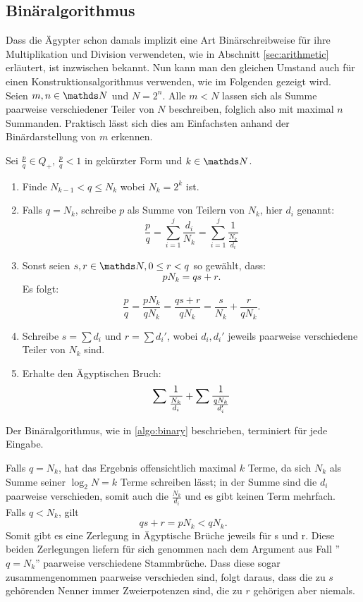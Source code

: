 \subsection{Binäralgorithmus}

Dass die Ägypter schon damals implizit eine Art Binärschreibweise für ihre Multiplikation und Division verwendeten, wie in Abschnitt \ref{sec:arithmetic} erläutert, ist inzwischen bekannt. Nun kann man den gleichen Umstand auch für einen Konstruktionsalgorithmus verwenden, wie im Folgenden gezeigt wird.\\
Seien $m, n \in \N$ und $N = 2^n$. Alle $m < N$ lassen sich als Summe paarweise verschiedener Teiler von $N$ beschreiben, folglich also mit maximal $n$ Summanden. Praktisch lässt sich dies am Einfachsten anhand der Binärdarstellung von $m$ erkennen.

\begin{algorithm}\label{algo:binary}
	Sei $\frac{p}{q} \in Q_+, \, \frac{p}{q} < 1$ in gekürzter Form und $k \in \N$.
	\begin{enumerate}
		\item Finde $N_{k-1} < q \leq N_k$ wobei $N_k=2^k$ ist.
		\item Falls $q = N_k$, schreibe $p$ als Summe von Teilern von $N_k$, hier $d_i$ genannt:
		$$\frac{p}{q} = \sum_{i=1}^{j} \frac{d_i}{N_k}=  \sum_{i = 1}^{j}\frac{1}{\frac{N_k}{d_i}}$$
		\item Sonst seien $s, r \in \N, 0 \leq r < q$ so gewählt, dass:
		$$pN_k = qs+r.$$
		Es folgt:
		$$\frac{p}{q} = \frac{p N_k}{q N_k} = \frac{qs + r}{q N_k} = \frac{s}{N_k} + \frac{r}{q N_k}.$$
		\item Schreibe $s = \sum d_i$ und $r = \sum d_i'$, wobei $d_i, d_i'$ jeweils paarweise verschiedene Teiler von $N_k$ sind.
		\item Erhalte den Ägyptischen Bruch:
		$$\sum \frac{1}{\frac{N_k}{d_i}} + \sum \frac{1}{\frac{q N_k}{d_i'}}$$
	\end{enumerate}
\end{algorithm}

\begin{satz}
	Der Binäralgorithmus, wie in \ref{algo:binary} beschrieben, terminiert für jede Eingabe.
\end{satz}

\begin{bew}
	Falls $q = N_k$, hat das Ergebnis offensichtlich maximal $k$ Terme, da sich $N_k$ als Summe seiner $\log_2 N = k$ Terme schreiben lässt; in der Summe sind die $d_i$ paarweise verschieden, somit auch die $\frac{N_k}{d_i}$ und es gibt keinen Term mehrfach.\\
	Falls $q < N_k$, gilt
	$$qs+r = p N_k < q N_k.$$
	Somit gibt es eine Zerlegung in Ägyptische Brüche jeweils für s und r. Diese beiden Zerlegungen liefern für sich genommen nach dem Argument aus Fall ''$q = N_k$'' paarweise verschiedene Stammbrüche. Dass diese sogar zusammengenommen paarweise verschieden sind, folgt daraus, dass die zu $s$ gehörenden Nenner immer Zweierpotenzen sind, die zu $r$ gehörigen aber niemals.
\end{bew}


